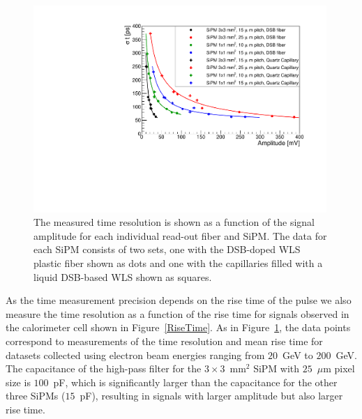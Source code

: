 \begin{figure}[!htb]
\centering
\includegraphics[width=0.99\textwidth]{figures/ShashlikTimeResolution.pdf}
\caption{\label{TimeResolution} The measured time resolution is shown as a
function of the signal amplitude for each individual read-out fiber and SiPM.
The data for each SiPM consists of two sets, one with the DSB-doped WLS plastic fiber
shown as dots and one with the capillaries filled with a liquid DSB-based WLS shown as
squares. }
\end{figure}


As the time measurement precision depends on the rise time of the pulse we also
measure the time resolution as a function of the rise time for signals observed
in the calorimeter cell shown in Figure~\ref{RiseTime}. As in
Figure~\ref{TimeResolution}, the data points correspond to measurements of the
time resolution and mean rise time for datasets collected using electron beam
energies ranging from $20$~GeV to $200$~GeV. The capacitance of the high-pass
filter for the $3\times3$~$\mathrm{mm}^{2}$ SiPM with $25$~$\mu$m pixel size is
$100$~pF, which is significantly larger than the capacitance for the other three
SiPMs ($15$~pF), resulting in signals with larger amplitude but also larger rise
time.

